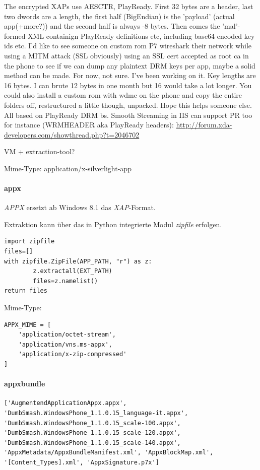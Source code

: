 The encrypted XAPs use AESCTR, PlayReady. First 32 bytes are a header, last two dwords are a length, the first half (BigEndian) is the 'payload' (actual app(+more?)) and the second half is always -8 bytes. Then comes the 'mal'-formed XML containign PlayReady definitions etc, including base64 encoded key ids etc. I'd like to see someone on custom rom P7 wireshark their network while using a MITM attack (SSL obviously) using an SSL cert accepted as root ca in the phone to see if we can dump any plaintext DRM keys per app, maybe a solid method can be made. For now, not sure. I've been working on it. Key lengths are 16 bytes. I can brute 12 bytes in one month but 16 would take a lot longer. You could also install a custom rom with wdmc on the phone and copy the entire folders off, restructured a little though, unpacked. Hope this helps someone else. All based on PlayReady DRM bs. Smooth Streaming in IIS can support PR too for instance (WRMHEADER aka PlayReady headers):
\url{http://forum.xda-developers.com/showthread.php?t=2046702}

VM + extraction-tool?

Mime-Type: application/x-silverlight-app

\paragraph{appx}
\textit{APPX} ersetzt ab Windows 8.1 das \textit{XAP}-Format.

Extraktion kann über das in Python integrierte Modul \textit{zipfile} erfolgen.
\begin{lstlisting}
import zipfile
files=[]
with zipfile.ZipFile(APP_PATH, "r") as z:
        z.extractall(EXT_PATH)
        files=z.namelist()
return files
\end{lstlisting}
Mime-Type:
\begin{lstlisting}
APPX_MIME = [
    'application/octet-stream',
    'application/vns.ms-appx',
    'application/x-zip-compressed'
]
\end{lstlisting}

\paragraph{appxbundle}

\begin{lstlisting}
['AugmentendApplicationAppx.appx', 'DumbSmash.WindowsPhone_1.1.0.15_language-it.appx', 'DumbSmash.WindowsPhone_1.1.0.15_scale-100.appx', 'DumbSmash.WindowsPhone_1.1.0.15_scale-120.appx', 'DumbSmash.WindowsPhone_1.1.0.15_scale-140.appx', 'AppxMetadata/AppxBundleManifest.xml', 'AppxBlockMap.xml', '[Content_Types].xml', 'AppxSignature.p7x']
\end{lstlisting}

